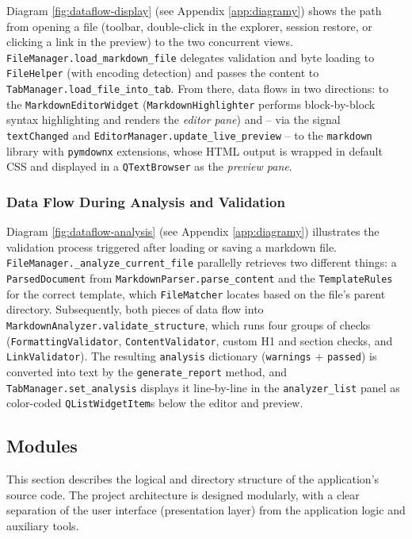 \documentclass[12pt, a4paper]{article}
\begin{document}
Diagram \ref{fig:dataflow-display} (see Appendix \ref{app:diagramy}) shows the path from 
opening a file (toolbar, double-click in the explorer, session restore, or clicking a link in the preview) 
to the two concurrent views. \texttt{FileManager.\allowbreak load\_markdown\_file} delegates 
validation and byte loading to \texttt{FileHelper} (with encoding detection) and passes the 
content to \texttt{TabManager.\allowbreak load\_file\_into\_tab}. From there, data flows in two 
directions: to the \texttt{MarkdownEditorWidget} (\texttt{MarkdownHighlighter} performs 
block-by-block syntax highlighting and renders the \emph{editor pane}) and -- via the signal \texttt{textChanged} 
and \texttt{EditorManager.\allowbreak update\_live\_preview} -- to the \texttt{markdown} 
library with \texttt{pymdownx} extensions, whose HTML output is wrapped in default CSS and displayed 
in a \texttt{QTextBrowser} as the \emph{preview pane}.

\subsubsection*{Data Flow During Analysis and Validation}

Diagram \ref{fig:dataflow-analysis} (see Appendix \ref{app:diagramy}) illustrates the validation 
process triggered after loading or saving a markdown file. \texttt{FileManager.\allowbreak \_analyze\_current\_file}
parallelly retrieves two different things: a \texttt{ParsedDocument} from \texttt{MarkdownParser.\allowbreak parse\_content} 
and the \texttt{TemplateRules} for the correct template, which \texttt{FileMatcher} locates based on the file's parent directory. 
Subsequently, both pieces of data flow into \texttt{MarkdownAnalyzer.\allowbreak validate\_structure}, 
which runs four groups of checks (\texttt{FormattingValidator}, \texttt{ContentValidator}, custom H1 and 
section checks, and \texttt{LinkValidator}). The resulting \texttt{analysis} dictionary (\texttt{warnings} + \texttt{passed}) 
is converted into text by the \texttt{generate\_report} method, and \texttt{TabManager.\allowbreak set\_analysis} 
displays it line-by-line in the \texttt{analyzer\_list} panel as color-coded \texttt{QList\allowbreak Widget\allowbreak Item}s 
below the editor and preview.

\subsection{Modules}

This section describes the logical and directory structure of the application's source code. The project 
architecture is designed modularly, with a clear separation of the user interface (presentation layer) 
from the application logic and auxiliary tools.
\end{document}
